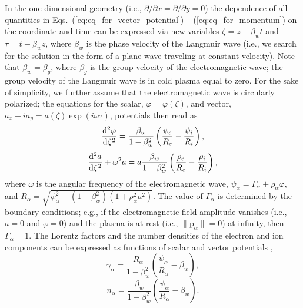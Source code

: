 \documentclass[10pt, a4paper, twoside, openright]{report}
\newcommand{\norm}[1]{\lVert#1\rVert}
\renewcommand{\vec}[1]{\boldsymbol{\mathrm{#1}}}
\begin{document}
In the one-dimensional geometry (i.e., $ \partial / \partial x = \partial / \partial y = 0 $) the dependence of all quantities in Eqs.~(\ref{eq:eq_for_vector_potential}) -- (\ref{eq:eq_for_momentum}) on the coordinate and time can be expressed via new variables $ \zeta = z - \beta_{w} t $ and $ \tau = t - \beta_{w} z $, where $ \beta_{w} $ is the phase velocity of the Langmuir wave (i.e., we search for the solution in the form of a plane wave traveling at constant velocity). Note that $ \beta_w = \beta_g $, where $ \beta_g $ is the group velocity of the electromagnetic wave; the group velocity of the Langmuir wave is in cold plasma equal to zero. For the sake of simplicity, we further assume that the electromagnetic wave is circularly polarized; the equations for the scalar, $ \varphi = \varphi \left( \zeta \right) $, and vector, $ a_x + i a_y = a \left( \zeta \right) \exp \left( i \omega \tau \right) $, potentials then read as \cite{Farina2001, Bulanov2013, Bulanov2021}
\begin{equation}\label{eq:eq_for_scalar_potential_2}
\diff[2]{\varphi}{\zeta} = \frac{\beta_{w}}{1 - \beta_{w}^2} \left(\frac{\psi_e}{R_e} - \frac{\psi_i}{R_i} \right),
\end{equation}
\begin{equation}\label{eq:eq_for_vector_potential_2}
\diff[2]{a}{\zeta} + \omega^2 a = a \frac{\beta_{w}}{1 - \beta_{w}^2}  \left(\frac{\rho_e}{R_e} - \frac{\rho_i}{R_i} \right),
\end{equation}
where $ \omega $ is the angular frequency of the electromagnetic wave, $ \psi_{\alpha} = \mathit{\Gamma}_{\alpha} + \rho_{\alpha} \varphi $, and $ R_{\alpha} = \sqrt{\psi_{\alpha}^2 - \left(1 - \beta_w^2 \right) \left(1 + \rho_{\alpha}^2 a^2 \right)} $. The value of $ \mathit{\Gamma}_{\alpha} $ is determined by the boundary conditions; e.g., if the electromagnetic field amplitude vanishes (i.e., $ a = 0 $ and $ \varphi = 0 $) and the plasma is at rest (i.e., $ \norm{\vec{p}_{\alpha}} = 0 $) at infinity, then $ \mathit{\Gamma}_{\alpha} = 1 $. The Lorentz factors and the number densities of the electron and ion components can be expressed as functions of scalar and vector potentials \cite{Farina2001, Bulanov2013, Bulanov2021},
\begin{equation}\label{eq:gamma_factor_Langmuir_wave}
\gamma_{\alpha} = \frac{R_{\alpha}}{1 - \beta_w^2} \left( \frac{\psi_{\alpha}}{R_{\alpha}} - \beta_w \right),
\end{equation}
\begin{equation}\label{eq:electron_density_Langmuir_wave}
n_{\alpha} = \frac{\beta_w}{1 - \beta_w^2} \left( \frac{\psi_{\alpha}}{R_{\alpha}} - \beta_w \right).
\end{equation}
\end{document}
